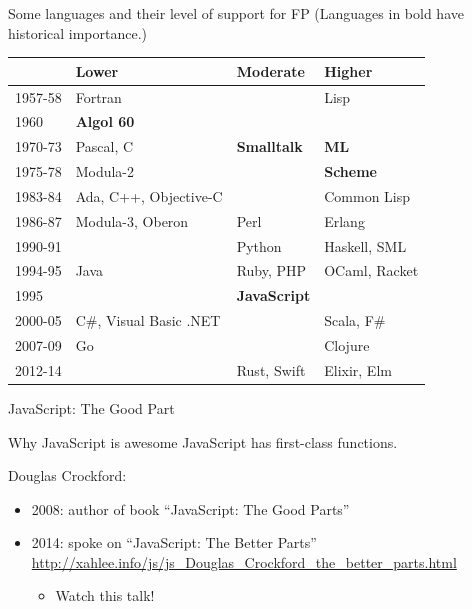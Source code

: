 \begin{frame}{Some languages and their level of support for FP}
  (Languages in bold have historical importance.)

  \begin{table}
    \begin{tabular}{| l || l | l | l |}
      \toprule
      & Lower & Moderate & Higher \\
      \midrule
      1957-58 & Fortran & & Lisp \\
      1960 & \textbf{Algol 60} & & \\
      1970-73 & Pascal, C & \textbf{Smalltalk} & \textbf{ML} \\
      1975-78 & Modula-2 & & \textbf{Scheme} \\
      1983-84 & Ada, C++, Objective-C & & Common Lisp \\
      1986-87 & Modula-3, Oberon & Perl & Erlang \\
      1990-91 & & Python & Haskell, SML \\
      1994-95 & Java & Ruby, PHP & OCaml, Racket \\
      1995 & & \textbf{JavaScript} &  \\
      2000-05 & C\#, Visual Basic .NET & & Scala, F\# \\
      2007-09 & Go & & Clojure \\
      2012-14 & & Rust, Swift & Elixir, Elm \\
      \bottomrule
    \end{tabular}
  \end{table}
\end{frame}

\begin{frame}{JavaScript: The Good Part}
  \begin{block}{Why JavaScript is awesome}
    JavaScript has first-class functions.
  \end{block}

  Douglas Crockford:
  \begin{itemize}
  \item 2008: author of book ``JavaScript: The Good Parts''
  \item 2014: spoke on ``JavaScript: The Better Parts''
    \url{http://xahlee.info/js/js_Douglas_Crockford_the_better_parts.html}
    \begin{itemize}
    \item Watch this talk!
    \end{itemize}
  \end{itemize}
\end{frame}

